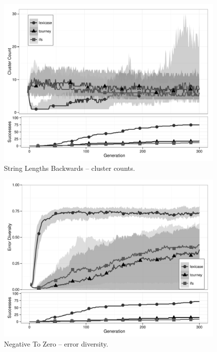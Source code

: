 \begin{figure}[p] %
\centering
\includegraphics[width=11.5cm]{string-lengths-backwards-cluster.pdf}
\caption{String Lengths Backwards -- cluster counts.}
\label{string-lengths-backwardsClu}
\end{figure}

\begin{figure}[p] %
\centering
\includegraphics[width=11.5cm]{negative-to-zero-diversity.pdf}
\caption{Negative To Zero -- error diversity.}
\label{negative-to-zeroDiv}
\end{figure}

